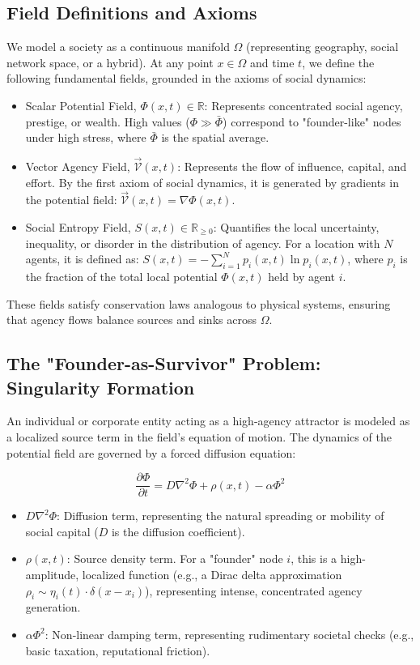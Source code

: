 \documentclass[11pt]{article}
\begin{document}
\subsection{Field Definitions and Axioms}

We model a society as a continuous manifold $\Omega$ (representing geography, social network space, or a hybrid). At any point $x \in \Omega$ and time $t$, we define the following fundamental fields, grounded in the axioms of social dynamics:

\begin{itemize}
\item Scalar Potential Field, $\Phi(x, t) \in \mathbb{R}$: Represents concentrated social agency, prestige, or wealth. High values ($\Phi \gg \bar{\Phi}$) correspond to "founder-like" nodes under high stress, where $\bar{\Phi}$ is the spatial average.
\item Vector Agency Field, $\vec{\mathcal{V}}(x, t)$: Represents the flow of influence, capital, and effort. By the first axiom of social dynamics, it is generated by gradients in the potential field: $\vec{\mathcal{V}}(x, t) = \nabla \Phi(x, t)$.
\item Social Entropy Field, $S(x, t) \in \mathbb{R}_{\geq 0}$: Quantifies the local uncertainty, inequality, or disorder in the distribution of agency. For a location with $N$ agents, it is defined as: $S(x, t) = -\sum_{i=1}^{N} p_i(x, t) \ln p_i(x, t)$, where $p_i$ is the fraction of the total local potential $\Phi(x, t)$ held by agent $i$.
\end{itemize}

These fields satisfy conservation laws analogous to physical systems, ensuring that agency flows balance sources and sinks across $\Omega$.

\subsection{The "Founder-as-Survivor" Problem: Singularity Formation}

An individual or corporate entity acting as a high-agency attractor is modeled as a localized source term in the field's equation of motion. The dynamics of the potential field are governed by a forced diffusion equation:

\begin{equation}
\frac{\partial \Phi}{\partial t} = D \nabla^2 \Phi + \rho(x, t) - \alpha \Phi^2
\end{equation}

\begin{itemize}
\item $D \nabla^2 \Phi$: Diffusion term, representing the natural spreading or mobility of social capital ($D$ is the diffusion coefficient).
\item $\rho(x, t)$: Source density term. For a "founder" node $i$, this is a high-amplitude, localized function (e.g., a Dirac delta approximation $\rho_i \sim \eta_i(t) \cdot \delta(x - x_i)$), representing intense, concentrated agency generation.
\item $\alpha \Phi^2$: Non-linear damping term, representing rudimentary societal checks (e.g., basic taxation, reputational friction).
\end{itemize}
\end{document}
